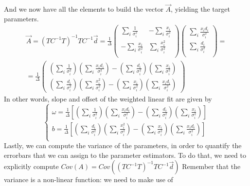 \documentclass[a4paper,11pt,fleqn]{article}
\begin{document}
And we now have all the elements to build the vector $\vec{A}$, yielding the 
target parameters.
\begin{gather*}
    \vec{A} = (TC^{-1}T)^{-1}TC^{-1}\vec{d} = \frac{1}{\Delta}
    \begin{pmatrix}
        \sum_i \frac{1}{\sigma_i^2} & -\sum_i \frac{x_i}{\sigma_i^2} \\
        -\sum_i \frac{x_i}{\sigma_i^2} & \sum_i \frac{x_i^2}{\sigma_i^2} \\
    \end{pmatrix}
    \begin{pmatrix}
        \sum_i \frac{x_i d_i}{\sigma_i^2} \\
        \sum_i \frac{d_i}{\sigma_i^2} \\
    \end{pmatrix} = \\ = \frac{1}{\Delta}
    \begin{pmatrix}
        \left(\sum_i\frac{1}{\sigma_i^2}\right)\left(\sum_i\frac{x_i d_i}{\sigma_i^2}\right) - \left(\sum_i\frac{d_i}{\sigma_i^2}\right)\left(\sum_i\frac{x_i}{\sigma_i^2}\right) \\
        \left(\sum_i\frac{d_i}{\sigma_i^2}\right) \left(\sum_i\frac{x_i^2}{\sigma_i^2}\right) - \left(\sum_i\frac{x_i}{\sigma_i^2}\right)\left(\sum_i\frac{x_i d_i}{\sigma_i^2}\right)
    \end{pmatrix}
\end{gather*}
In other words, slope and offset of the weighted linear fit are given by 
\begin{equation}
    \begin{cases}
        \omega = \frac{1}{\Delta} \left[\left(\sum_i\frac{1}{\sigma_i^2}\right)\left(\sum_i\frac{x_i d_i}{\sigma_i^2}\right) - \left(\sum_i\frac{d_i}{\sigma_i^2}\right)\left(\sum_i\frac{x_i}{\sigma_i^2}\right)\right] \\
        b = \frac{1}{\Delta} \left[ \left(\sum_i\frac{d_i}{\sigma_i^2}\right) \left(\sum_i\frac{x_i^2}{\sigma_i^2}\right) - \left(\sum_i\frac{x_i}{\sigma_i^2}\right)\left(\sum_i\frac{x_i d_i}{\sigma_i^2}\right)\right] \\
    \end{cases}
\end{equation}
Lastly, we can compute the variance of the parameters, in order to quantify
the errorbars that we can assign to the parameter estimators. To do that, 
we need to explicitly compute $Cov(A) = Cov((TC^{-1}T)^{-1}TC^{-1}\vec{d})$
Remember that the variance is a non-linear function: we need to make use of 
\end{document}
